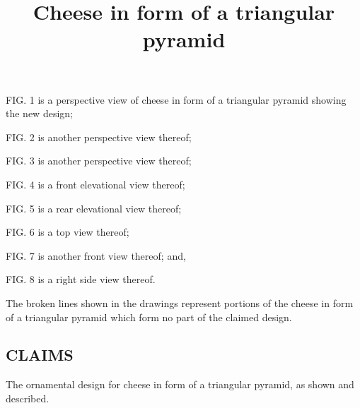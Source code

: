 \documentclass[11pt,a4paper]{article}
\title{Cheese in form of a triangular pyramid}
\begin{document}
\maketitle

FIG. 1 is a perspective view of cheese in form of a triangular pyramid showing the new design;

FIG. 2 is another perspective view thereof;

FIG. 3 is another perspective view thereof;

FIG. 4 is a front elevational view thereof;

FIG. 5 is a rear elevational view thereof;

FIG. 6 is a top view thereof;

FIG. 7 is another front view thereof; and,

FIG. 8 is a right side view thereof.

The broken lines shown in the drawings represent portions of the cheese in form of a triangular pyramid which form no part of the claimed design.

\subsection{CLAIMS}

The ornamental design for cheese in form of a triangular pyramid, as shown and described.
\end{document}
